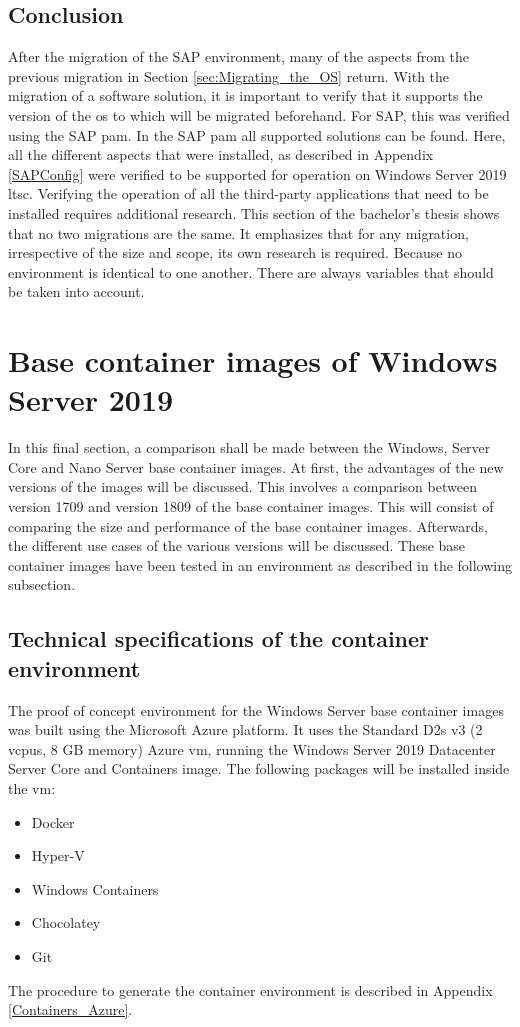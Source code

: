 \subsection{Conclusion}
After the migration of the SAP environment, many of the aspects from the previous migration in Section \ref{sec:Migrating_the_OS} return. 
With the migration of a software solution, it is important to verify that it supports the version of the \acrshort{os} to which will be migrated beforehand. 
For SAP, this was verified using the SAP \acrshort{pam}.
In the SAP \acrshort{pam} all supported solutions can be found.
Here, all the different aspects that were installed, as described in Appendix \ref{SAPConfig} were verified to be supported for operation on Windows Server 2019 \acrshort{ltsc}. 
Verifying the operation of all the third-party applications that need to be installed requires additional research. 
This section of the bachelor's thesis shows that no two migrations are the same. 
It emphasizes that for any migration, irrespective of the size and scope, its own research is required. Because no environment is identical to one another. 
There are always variables that should be taken into account.  
\clearpage

\section{Base container images of Windows Server 2019}
In this final section, a comparison shall be made between the Windows, Server Core and Nano Server base container images. 
At first, the advantages of the new versions of the images will be discussed. 
This involves a comparison between version 1709 and version 1809 of the base container images. 
This will consist of comparing the size and performance of the base container images. 
Afterwards, the different use cases of the various versions will be discussed. 
These base container images have been tested in an environment as described in the following subsection.

\subsection{Technical specifications of the container environment}
The proof of concept environment for the Windows Server base container images was built using the Microsoft Azure platform. 
It uses the Standard D2s v3 (2 vcpus, 8 GB memory) Azure \acrshort{vm}, running the Windows Server 2019 Datacenter Server Core and Containers image.
The following packages will be installed inside the \acrshort{vm}:
\begin{itemize}
	\item Docker
	\item Hyper-V
	\item Windows Containers
	\item Chocolatey
	\item Git
\end{itemize}
The procedure to generate the container environment is described in Appendix \ref{Containers_Azure}.

